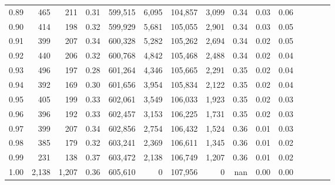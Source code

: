 \begin{tabular}{rrrcrrrrrrrrrrr}
0.89 &     465 &    211 &                                       0.31 &  599,515 &    6,095 &  104,857 &    3,099 &  0.34 &  0.03 &                         0.06 \\
0.90 &     414 &    198 &                                       0.32 &  599,929 &    5,681 &  105,055 &    2,901 &  0.34 &  0.03 &                         0.05 \\
0.91 &     399 &    207 &                                       0.34 &  600,328 &    5,282 &  105,262 &    2,694 &  0.34 &  0.02 &                         0.05 \\
0.92 &     440 &    206 &                                       0.32 &  600,768 &    4,842 &  105,468 &    2,488 &  0.34 &  0.02 &                         0.04 \\
0.93 &     496 &    197 &                                       0.28 &  601,264 &    4,346 &  105,665 &    2,291 &  0.35 &  0.02 &                         0.04 \\
0.94 &     392 &    169 &                                       0.30 &  601,656 &    3,954 &  105,834 &    2,122 &  0.35 &  0.02 &                         0.04 \\
0.95 &     405 &    199 &                                       0.33 &  602,061 &    3,549 &  106,033 &    1,923 &  0.35 &  0.02 &                         0.03 \\
0.96 &     396 &    192 &                                       0.33 &  602,457 &    3,153 &  106,225 &    1,731 &  0.35 &  0.02 &                         0.03 \\
0.97 &     399 &    207 &                                       0.34 &  602,856 &    2,754 &  106,432 &    1,524 &  0.36 &  0.01 &                         0.03 \\
0.98 &     385 &    179 &                                       0.32 &  603,241 &    2,369 &  106,611 &    1,345 &  0.36 &  0.01 &                         0.02 \\
0.99 &     231 &    138 &                                       0.37 &  603,472 &    2,138 &  106,749 &    1,207 &  0.36 &  0.01 &                         0.02 \\
1.00 &   2,138 &  1,207 &                                       0.36 &  605,610 &        0 &  107,956 &        0 &   nan &  0.00 &                         0.00 \\
\bottomrule
\end{tabular}
